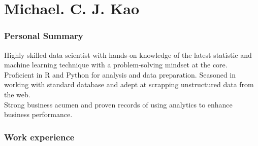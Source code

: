 \documentclass{tccv}
\begin{document}
\part{Michael. C. J. Kao}

\section{Personal Summary}

Highly skilled data scientist with hands-on knowledge of the latest
statistic and machine learning technique with a problem-solving
mindset at the core.\\

Proficient in R and Python for analysis and data preparation. Seasoned
in working with standard database and adept at scrapping unstructured
data from the web.\\

Strong business acumen and proven records of using analytics to
enhance business performance. 







\section{Work experience}
\end{document}
